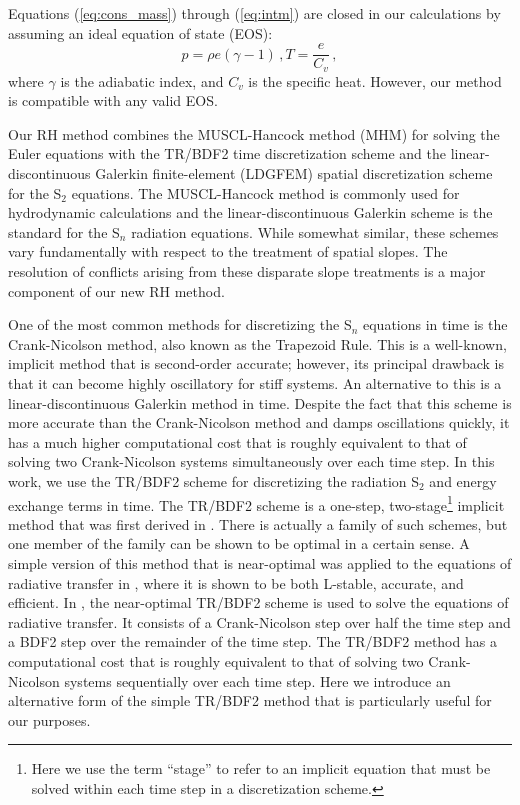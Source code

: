 \documentclass[preprint,12pt]{elsarticle}
\newcommand{\be}{\begin{equation}}
\newcommand{\ee}{\end{equation}}
\newcommand{\pec}{\, ,}
\newcommand{\lequ}[1]{\label{eq:#1}}
\newcommand{\requ}[1]{(\ref{eq:#1})}
\begin{document}
Equations \requ{cons_mass} through \requ{intm} are closed in our calculations by assuming an ideal equation of state (EOS):
\begin{subequations}
\be
p=\rho e (\gamma -1)
\lequ{pressure}
\pec
\ee
\be
T = \frac{e}{C_v} \pec
\lequ{mattemp}
\ee
\end{subequations}
where $\gamma$ is the adiabatic index, and $C_v$ is the specific heat.  However, our method is compatible with any valid EOS. 

Our RH method combines the MUSCL-Hancock method (MHM) for solving the Euler equations with the TR/BDF2 time discretization 
scheme and the linear-discontinuous Galerkin finite-element (LDGFEM) spatial discretization scheme for the S$_2$ equations.  
The MUSCL-Hancock method is commonly used for hydrodynamic calculations and the linear-discontinuous Galerkin scheme is the 
standard for the S$_n$ radiation equations.  While somewhat similar, these schemes vary fundamentally with respect to the 
treatment of spatial slopes.  The resolution of conflicts arising from these disparate 
slope treatments is a major component of our new RH method.

One of the most common methods for discretizing the S$_n$ equations in time is the Crank-Nicolson method, also known as the 
Trapezoid Rule. This is a well-known, implicit method that is second-order accurate; however, its principal drawback is that 
it can become highly oscillatory for stiff systems.  An alternative to this is a linear-discontinuous Galerkin method in time.  
Despite the fact that this scheme is more accurate than the Crank-Nicolson method and damps oscillations quickly, it has a 
much higher computational cost that is roughly equivalent to that of solving two Crank-Nicolson systems simultaneously over 
each time step.  In this work, we use the TR/BDF2 scheme for discretizing the radiation S$_2$ and energy exchange terms in time.  
The TR/BDF2 scheme is a one-step, two-stage\footnote{Here we use the term ``stage'' to refer to an implicit equation that must 
be solved within each time step in a discretization scheme.} implicit method that was first derived in \cite{bank}.   There is 
actually a family of such schemes, but one member of the family can be shown to be optimal in a certain sense.  A simple version 
of this method that is near-optimal was applied to the equations of radiative transfer in \cite{EM2011}, where it is shown to be 
both L-stable, accurate, and efficient.  In \cite{EM2011}, the near-optimal TR/BDF2 scheme is used to solve the equations of 
radiative transfer. It consists of a Crank-Nicolson step over half the time step and a BDF2 step over 
the remainder of the time step.  The TR/BDF2 method has a computational cost that is roughly equivalent to that of solving two 
Crank-Nicolson systems sequentially over each time step.  Here we introduce an alternative form 
of the simple TR/BDF2 method that is particularly useful for our purposes.  
\end{document}
